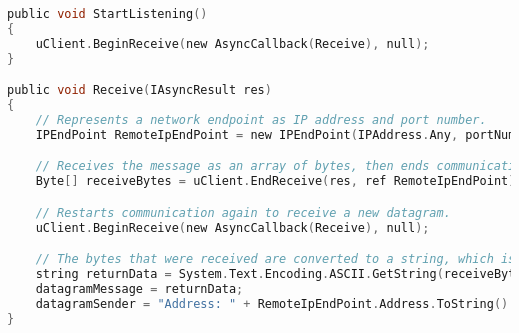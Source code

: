 \begin{lstlisting}[caption={Receiving data from host},language=C,label={lst:receivedata}]
public void StartListening()
{
    uClient.BeginReceive(new AsyncCallback(Receive), null);
}

public void Receive(IAsyncResult res)
{
    // Represents a network endpoint as IP address and port number.
    IPEndPoint RemoteIpEndPoint = new IPEndPoint(IPAddress.Any, portNumber);

    // Receives the message as an array of bytes, then ends communication with the remote endpoint.
    Byte[] receiveBytes = uClient.EndReceive(res, ref RemoteIpEndPoint);

    // Restarts communication again to receive a new datagram.
    uClient.BeginReceive(new AsyncCallback(Receive), null);

    // The bytes that were received are converted to a string, which is written to the unity debug log.
    string returnData = System.Text.Encoding.ASCII.GetString(receiveBytes);
    datagramMessage = returnData;
    datagramSender = "Address: " + RemoteIpEndPoint.Address.ToString() + ", port: " + RemoteIpEndPoint.Port.ToString();
}
\end{lstlisting}